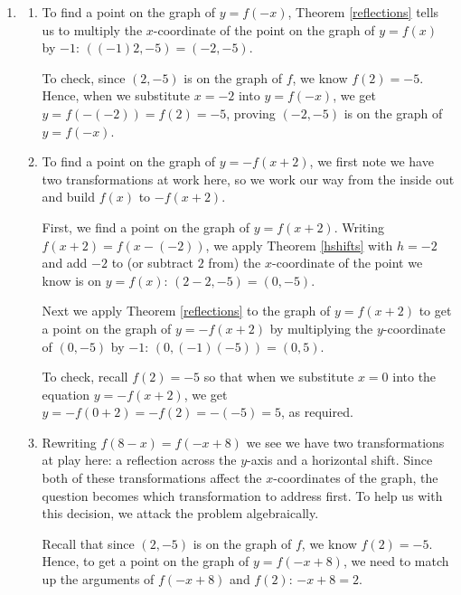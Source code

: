 \begin{ex}
\begin{enumerate}
 \item 
 
 \begin{enumerate}
 
 \item To find a point on the graph of $y=f(-x)$, Theorem \ref{reflections} tells us to multiply the $x$-coordinate of the point on the graph of $y=f(x)$ by $-1$:  $((-1)2, -5) = (-2,-5)$.  
 
 \smallskip
 
 To check, since $(2,-5)$ is on the graph of $f$, we know $f(2) = -5$.  Hence, when we substitute $x=-2$ into $y = f(-x)$, we get $y = f(-(-2)) = f(2) = -5$, proving $(-2,-5)$ is on the graph of $y=f(-x)$.
 
 \item To find a point on the graph of $y = -f(x+2)$, we first note we have two transformations at work here, so we work our way from the inside out and build $f(x)$ to $-f(x+2)$. 
 
 \smallskip
 
 First, we find a point on the graph of $y=f(x+2)$.  Writing $f(x+2) = f(x-(-2))$, we apply Theorem \ref{hshifts} with $h=-2$ and add $-2$ to (or subtract $2$ from) the $x$-coordinate of the point we know is on $y=f(x)$:   $(2-2,-5) =  (0,-5)$. 
 
 \smallskip
 
  Next we apply Theorem \ref{reflections} to the graph of $y=f(x+2)$ to get a point on the graph of $y=-f(x+2)$ by multiplying the $y$-coordinate of $(0,-5)$ by $-1$:  $(0, (-1)(-5)) = (0,5)$.  
  
  \smallskip
  
  To check, recall $f(2)=-5$ so that when we substitute $x=0$ into the equation $y = -f(x+2)$, we get $y=-f(0+2) = -f(2) = -(-5)=5$, as required. 
 
 
 \item  Rewriting  $f(8-x) = f(-x+8)$ we see we have two transformations at play here:  a reflection across the $y$-axis and a horizontal shift.  Since both of these transformations affect the $x$-coordinates of the graph, the question becomes which transformation to address first. To help us with this decision, we attack the problem algebraically.  
 
 \smallskip
 
 Recall that since $(2,-5)$ is on the graph of $f$, we know  $f(2) = -5$.  Hence, to get a point on the graph of $y = f(-x+8)$, we need to match up the arguments of $f(-x+8)$ and $f(2)$:  $-x+8 = 2$.  
 

\end{enumerate}
\end{enumerate}
\end{ex}
